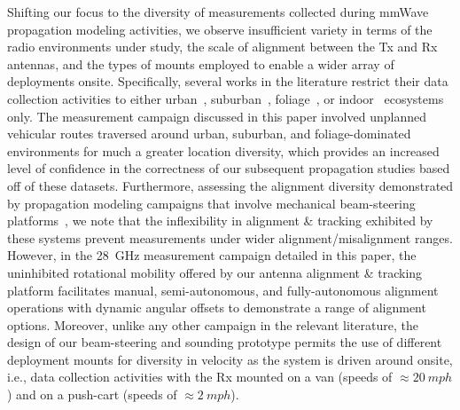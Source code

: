 \documentclass[12pt, draftcls, onecolumn]{IEEEtran}
\begin{document}
Shifting our focus to the diversity of measurements collected during mmWave propagation modeling activities, we observe insufficient variety in terms of the radio environments under study, the scale of alignment between the Tx and Rx antennas, and the types of mounts employed to enable a wider array of deployments onsite. Specifically, several works in the literature restrict their data collection activities to either urban~\cite{Outdoor28G, PDAPs, QDC_NIST, DopplerHST, V2XBlockages, MacCartneyUrbanHumanBlockage}, suburban~\cite{Purdue, SuburbanGeometryJournal}, foliage~\cite{Foliage, FoliageSimulations}, or indoor~\cite{AgileLink, Harvard, SpatialConsistencyOriginal, SpatialDynamics, Indoor60G, D2DHumanBlockage} ecosystems only. The measurement campaign discussed in this paper involved unplanned vehicular routes traversed around urban, suburban, and foliage-dominated environments for much a greater location diversity, which provides an increased level of confidence in the correctness of our subsequent propagation studies based off of these datasets. Furthermore, assessing the alignment diversity demonstrated by propagation modeling campaigns that involve mechanical beam-steering platforms~\cite{Purdue, Harvard, SpatialConsistencyOriginal, SpatialDynamics, SuburbanGeometryJournal, Outdoor28G, QDC_NIST, D2DHumanBlockage, MacCartneyUrbanHumanBlockage}, we note that the inflexibility in alignment \& tracking exhibited by these systems prevent measurements under wider alignment/misalignment ranges. However, in the \SI{28}{\giga\hertz} measurement campaign detailed in this paper, the uninhibited rotational mobility offered by our antenna alignment \& tracking platform facilitates manual, semi-autonomous, and fully-autonomous alignment operations with dynamic angular offsets to demonstrate a range of alignment options. Moreover, unlike any other campaign in the relevant literature, the design of our beam-steering and sounding prototype permits the use of different deployment mounts for diversity in velocity as the system is driven around onsite, i.e., data collection activities with the Rx mounted on a van (speeds of ${\approx}\SI{20}{mph}$) and on a push-cart (speeds of ${\approx}\SI{2}{mph}$).
\end{document}
